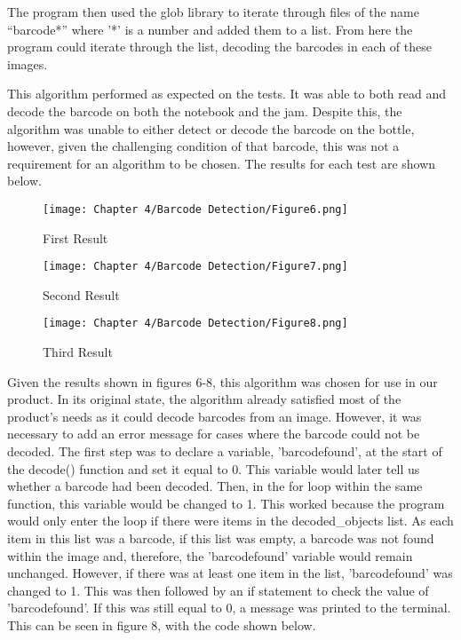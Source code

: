 The program then used the glob library to iterate through files of the name “barcode*” where '*' is a number and added them to a list.
From here the program could iterate through the list, decoding the barcodes in each of these images.

This algorithm performed as expected on the tests.
It was able to both read and decode the barcode on both the notebook and the jam.
Despite this, the algorithm was unable to either detect or decode the barcode on the bottle, however, given the challenging condition of that barcode, this was not a requirement for an algorithm to be chosen.
The results for each test are shown below.

\begin{figure}[H]        
    \centering
    \texttt{[image: Chapter 4/Barcode Detection/Figure6.png]}
    \caption{First Result}
    \label{fig:bc6} 
\end{figure} 

\begin{figure}[H]        
    \centering
    \texttt{[image: Chapter 4/Barcode Detection/Figure7.png]}
    \caption{Second Result}
    \label{fig:bc7} 
\end{figure} 

\begin{figure}[H]        
    \centering
    \texttt{[image: Chapter 4/Barcode Detection/Figure8.png]}
    \caption{Third Result}
    \label{fig:bc8} 
\end{figure} 


Given the results shown in figures 6-8, this algorithm was chosen for use in our product.
In its original state, the algorithm already satisfied most of the product's needs as it could decode barcodes from an image.
However, it was necessary to add an error message for cases where the barcode could not be decoded.
The first step was to declare a variable, 'barcodefound', at the start of the decode() function and set it equal to 0.
This variable would later tell us whether a barcode had been decoded.
Then, in the for loop within the same function, this variable would be changed to 1.
This worked because the program would only enter the loop if there were items in the decoded\_objects list.
As each item in this list was a barcode, if this list was empty, a barcode was not found within the image and, therefore, the 'barcodefound' variable would remain unchanged.
However, if there was at least one item in the list, 'barcodefound' was changed to 1.
This was then followed by an if statement to check the value of 'barcodefound'.
If this was still equal to 0, a message was printed to the terminal.
This can be seen in figure 8, with the code shown below.

